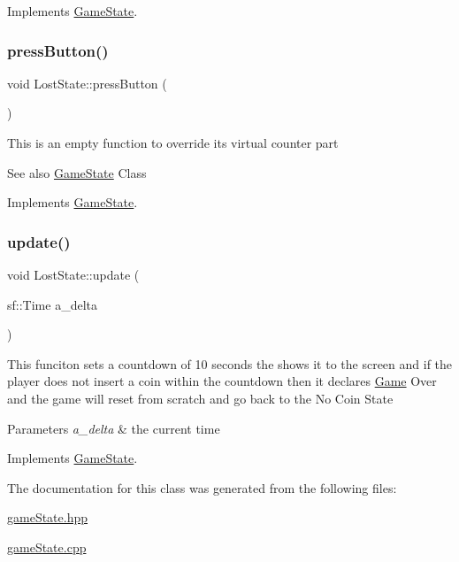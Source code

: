 Implements \hyperlink{class_game_state_aaae8c1b3ae6969eb2dd81bfc12fbf43f}{Game\+State}.

\mbox{\label{class_lost_state_ab0ec749961cfe909dc61289d14444a71}} 
\subsubsection{\texorpdfstring{press\+Button()}{pressButton()}}
{\footnotesize\ttfamily void Lost\+State\+::press\+Button (\begin{DoxyParamCaption}{ }\end{DoxyParamCaption})\hspace{0.3cm}{\ttfamily [virtual]}}

This is an empty function to override it\textquotesingle{}s virtual counter part \begin{DoxySeeAlso}{See also}
\hyperlink{class_game_state}{Game\+State} Class 
\end{DoxySeeAlso}


Implements \hyperlink{class_game_state_aa14eeaf244bcf19b7013af75cb722dde}{Game\+State}.

\mbox{\label{class_lost_state_a16d5e12284d03f8dd6b25a897b25839b}} 
\subsubsection{\texorpdfstring{update()}{update()}}
{\footnotesize\ttfamily void Lost\+State\+::update (\begin{DoxyParamCaption}\item[{sf\+::\+Time}]{a\+\_\+delta }\end{DoxyParamCaption})\hspace{0.3cm}{\ttfamily [virtual]}}

This funciton sets a countdown of 10 seconds the shows it to the screen and if the player does not insert a coin within the countdown then it declares \hyperlink{class_game}{Game} Over and the game will reset from scratch and go back to the No Coin State


\begin{DoxyParams}{Parameters}
{\em a\+\_\+delta} & the current time \\
\hline
\end{DoxyParams}


Implements \hyperlink{class_game_state_ab1fe4312f7ce88e7dc11f9935dee67d1}{Game\+State}.



The documentation for this class was generated from the following files\+:\begin{DoxyCompactItemize}
\item 
\hyperlink{game_state_8hpp}{game\+State.\+hpp}\item 
\hyperlink{game_state_8cpp}{game\+State.\+cpp}\end{DoxyCompactItemize}
